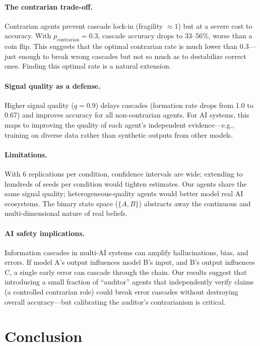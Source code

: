 \documentclass[11pt]{article}
\begin{document}
\paragraph{The contrarian trade-off.}
Contrarian agents prevent cascade lock-in (fragility $\approx 1$) but at a severe cost to accuracy.
With $p_\text{contrarian} = 0.3$, cascade accuracy drops to 33--56\%, worse than a coin flip.
This suggests that the optimal contrarian rate is much lower than 0.3---just enough to break wrong cascades but not so much as to destabilize correct ones.
Finding this optimal rate is a natural extension.

\paragraph{Signal quality as a defense.}
Higher signal quality ($q{=}0.9$) delays cascades (formation rate drops from 1.0 to 0.67) and improves accuracy for all non-contrarian agents.
For AI systems, this maps to improving the quality of each agent's independent evidence---e.g., training on diverse data rather than synthetic outputs from other models.

\paragraph{Limitations.}
With 6 replications per condition, confidence intervals are wide; extending to hundreds of seeds per condition would tighten estimates.
Our agents share the same signal quality; heterogeneous-quality agents would better model real AI ecosystems.
The binary state space ($\{A, B\}$) abstracts away the continuous and multi-dimensional nature of real beliefs.

\paragraph{AI safety implications.}
Information cascades in multi-AI systems can amplify hallucinations, bias, and errors.
If model A's output influences model B's input, and B's output influences C, a single early error can cascade through the chain.
Our results suggest that introducing a small fraction of ``auditor'' agents that independently verify claims (a controlled contrarian role) could break error cascades without destroying overall accuracy---but calibrating the auditor's contrarianism is critical.

\section{Conclusion}
\end{document}
